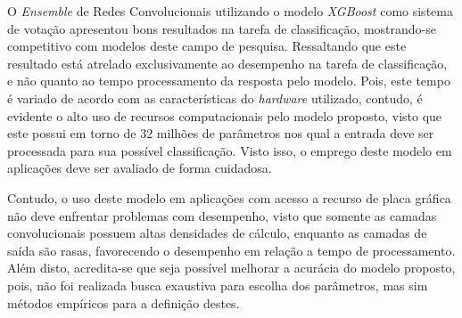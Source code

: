 O \textit{Ensemble} de Redes Convolucionais utilizando o modelo \textit{XGBoost} como sistema de votação apresentou bons resultados na tarefa de classificação, mostrando-se competitivo com modelos deste campo de pesquisa. Ressaltando que este resultado está atrelado exclusivamente ao desempenho na tarefa de classificação, e não quanto ao tempo processamento da resposta pelo modelo. Pois, este tempo é variado de acordo com as características do \textit{hardware} utilizado, contudo, é evidente o alto uso de recursos computacionais pelo modelo proposto, visto que este possui em torno de $32$ milhões de parâmetros nos qual a entrada deve ser processada para sua possível classificação. Visto isso, o emprego deste modelo em aplicações deve ser avaliado de forma cuidadosa.

Contudo, o uso deste modelo em aplicações com acesso a recurso de placa gráfica não deve enfrentar problemas com desempenho, visto que somente as camadas convolucionais possuem altas densidades de cálculo, enquanto as camadas de saída são rasas, favorecendo o desempenho em relação a tempo de processamento. Além disto, acredita-se que seja possível melhorar a acurácia do modelo proposto, pois, não foi realizada busca exaustiva para escolha dos parâmetros, mas sim métodos empíricos para a definição destes.
